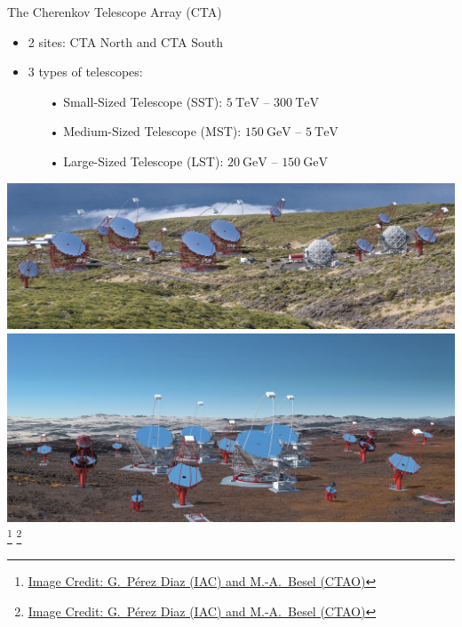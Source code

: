 \begin{frame}{The Cherenkov Telescope Array (CTA)}
    \begin{minipage}{0.55\textwidth}
      \begin{itemize}
        \setlength\itemsep{1em}
        \item 2 sites: CTA North and CTA South
        \item 3 types of telescopes:
        \begin{itemize}
          \setlength\itemsep{0.5em}
          \item [•] Small-Sized Telescope (SST): \;\(\SI{5}{\tera\eV}\) -- \(\SI{300}{\tera\eV}\)
          \item [•] Medium-Sized Telescope (MST): \;\(\SI{150}{\giga\eV}\) -- \(\SI{5}{\tera\eV}\)
          \item [•] Large-Sized Telescope (LST): \;\(\SI{20}{\giga\eV}\) -- \(\SI{150}{\giga\eV}\)
        \end{itemize}
      \end{itemize}
    \end{minipage}
    \begin{minipage}{0.42\textwidth}
      \begin{center}
        \includegraphics[width=\textwidth]{graphics/cta_north_render.jpg}
        \includegraphics[width=\textwidth]{graphics/cta_south_render.jpg}
        \vspace{-0.25cm}
        {%
        \footnote{\href{https://www.cta-observatory.org/about/how-cta-works/}{\textcolor{white!85!black}{Image Credit: G.~Pérez Diaz (IAC) and M.-A.~Besel (CTAO)}}}
        }
        {%
        \footnote{\href{https://www.cta-observatory.org/about/how-cta-works/}{\textcolor{darkgray!85!black}{Image Credit: G.~Pérez Diaz (IAC) and M.-A.~Besel (CTAO)}}}
        }
      \end{center}
    \end{minipage}
  \end{frame}
